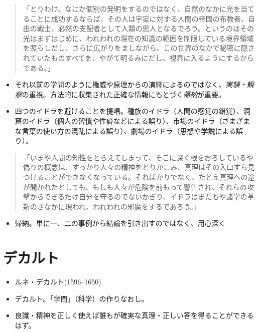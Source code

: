 \documentclass[uplatex,dvipdfmx]{jsarticle}
\begin{document}
 \begin{quote}
   「とりわけ、なにか個別の発明をするのではなく、自然のなかに光を当てることに成功するならば、その人は宇宙に対する人間の帝国の布教者、自由の戦士、必然の支配者として人類の恩人となるでろう。というのはその光はまずはじめに、われわれの現在の知識の範囲を制限している境界領域を照らしだし、さらに広がりをましながら、この世界のなかで秘密に隠されていたものすべてを、やがて明るみにだし、視界に入るようにするからである。」
 \end{quote}
\begin{itemize}

\item それ以前の学問のように権威や原理からの演繹によるのではなく、\emph{実験・観察}の重視。方法的に収集された正確な情報にもとづく\emph{帰納}が重要。

\item 四つのイドラを避けることを提唱。種族のイドラ（人間の感覚の錯覚）、洞窟のイドラ（個人の習慣や性癖などによる誤り）、市場のイドラ（さまざまな言葉の使い方の混乱による誤り）、劇場のイドラ（思想や学説による誤り）。
\end{itemize}

\begin{quote}
  「いまや人間の知性をとらえてしまって、そこに深く根をおろしているや偽りの概念は、すっかり人々の精神をとりかこみ、真理はその入口すら見つけることができなくなっている。そればかりでなく、たとえ真理への途が開かれたとしても、もしも人々が危険を前もって警告され、それらの攻撃からできるだけ自分を守るのでないかぎり、イドラはまたもや諸学の革新のさなかに現われ、われわれの邪魔をするであろう。」
\end{quote}
\begin{itemize}
\item 帰納。単に一、二の事例から結論を引き出すのではなく、用心深く

\end{itemize}



\section{デカルト}

\begin{itemize}
\item ルネ・デカルト(1596--1650)
\item デカルト。「学問」（科学）の作りなおし。
\item 良識・精神を正しく使えば誰もが確実な真理・正しい答を得ることができるはず。
\end{itemize}
\end{document}
